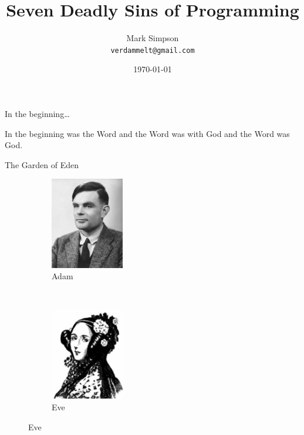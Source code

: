 \documentclass[12pt,xcolor=x11names]{beamer}
\title{Seven Deadly Sins of Programming}
\subtitle{}
\author{Mark Simpson \\ \texttt{verdammelt@gmail.com}}
\institute{Angst Programming IG}
\date{\today}
\begin{document}
\begin{frame}
    \titlepage
\end{frame}

\begin{frame}{In the beginning\ldots}

    In the beginning was the Word and the Word was with God and the Word was
    God.
    \pause
    
\end{frame}

\begin{frame}{The Garden of Eden}
    \begin{figure}
        \begin{subfigure}[b]{0.3\textwidth}
            \centering \includegraphics[height=4cm]{turing.jpg}
            \caption{Adam}
        \end{subfigure} 
        ~
        \begin{subfigure}[b]{0.3\textwidth}
            \centering \includegraphics[height=4cm]{lovelace.jpg}
            \caption{Eve}
        \end{subfigure}
    \end{figure}
\end{frame}
\end{document}
